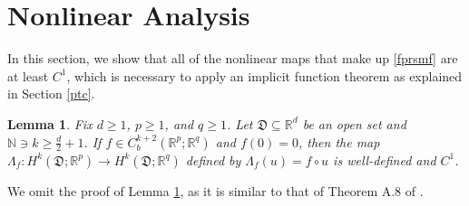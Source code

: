 \documentclass[11pt,letterpaper,reqno]{amsart}
\newtheorem{lemma}[theorem]{Lemma}
\numberwithin{equation}{section}
\begin{document}
\section{Nonlinear Analysis}
In this section, we show that all of the nonlinear maps that make up \eqref{fprsmf} are at least \(C^{1}\), which is necessary to apply an implicit function theorem as explained in Section \ref{ptc}.
\begin{lemma} \label{c2cont}
    Fix \(d \geq 1\), \(p \geq 1\), and \(q \geq 1\). Let \(\mathfrak{D} \subseteq \mathbb{R}^{d}\) be an open set and \(\mathbb{N} \ni k \geq \frac{d}{2}+1\). If \(f \in C_{b}^{k+2}(\mathbb{R}^{p};\mathbb{R}^{q})\) and \(f(0)=0\), then the map \(\Lambda_{f}:H^{k}(\mathfrak{D};\mathbb{R}^{p}) \to H^{k}(\mathfrak{D};\mathbb{R}^{q})\) defined by \(\Lambda_{f}(u)=f \circ u\) is well-defined and \(C^{1}\).
\end{lemma}
We omit the proof of Lemma \ref{c2cont}, as it is similar to that of Theorem A.8 of \cite{MR4785303}.
\end{document}
